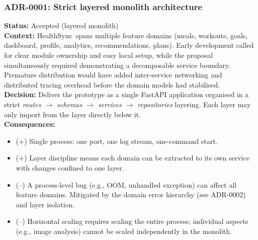 \documentclass[11pt]{article}
\newcommand{\ProjectName}{HealthSync}
\begin{document}
\subsubsection{ADR-0001: Strict layered monolith architecture}
\textbf{Status:} Accepted (layered monolith) \\
\textbf{Context:} \ProjectName\ spans multiple feature domains (meals, workouts, goals, dashboard,
profile, analytics, recommendations, plans). Early development called for clear module ownership and easy local setup, while the proposal simultaneously required
demonstrating a decomposable service boundary. Premature distribution would have added
inter-service networking and distributed tracing overhead before the domain models had stabilised. \\
\textbf{Decision:} Deliver the prototype as a single FastAPI application organised in a strict
\textit{routes $\to$ schemas $\to$ services $\to$ repositories} layering. Each layer may only import from the layer directly below it. \\
\textbf{Consequences:}
\begin{itemize}[leftmargin=1.2em]
  \item (+) Single process: one port, one log stream, one-command start.
  \item (+) Layer discipline means each domain can be extracted to its own service with changes
        confined to one layer.
  \item (--) A process-level bug (e.g., OOM, unhandled exception) can affect all feature domains.
        Mitigated by the domain error hierarchy (see ADR-0002) and layer isolation.
  \item (--) Horizontal scaling requires scaling the entire process; individual aspects
        (e.g., image analysis) cannot be scaled independently in the monolith.
\end{itemize}
\end{document}
